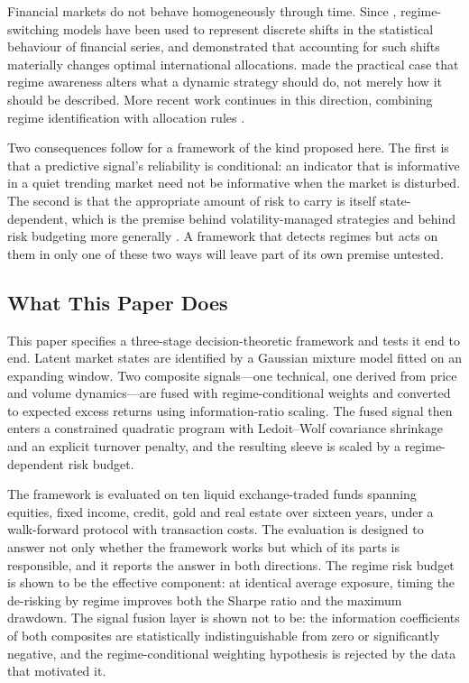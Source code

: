 Financial markets do not behave homogeneously through time. Since \citet{hamilton89},
regime-switching models have been used to represent discrete shifts in the statistical
behaviour of financial series, and \citet{angbekaert02} demonstrated that accounting for
such shifts materially changes optimal international allocations. \citet{kritzman12}
made the practical case that regime awareness alters what a dynamic strategy should do,
not merely how it should be described. More recent work continues in this direction,
combining regime identification with allocation rules \citep{li25, luo26}.

Two consequences follow for a framework of the kind proposed here. The first is that a
predictive signal's reliability is conditional: an indicator that is informative in a
quiet trending market need not be informative when the market is disturbed. The second
is that the appropriate amount of risk to carry is itself state-dependent, which is the
premise behind volatility-managed strategies \citep{moreira17, hood25} and behind risk
budgeting more generally \citep{asimit25}. A framework that detects regimes but acts on
them in only one of these two ways will leave part of its own premise untested.

\subsection{What This Paper Does}

This paper specifies a three-stage decision-theoretic framework and tests it end to
end. Latent market states are identified by a Gaussian mixture model fitted on an
expanding window. Two composite signals---one technical, one derived from price and
volume dynamics---are fused with regime-conditional weights and converted to expected
excess returns using information-ratio scaling. The fused signal then enters a
constrained quadratic program with Ledoit--Wolf covariance shrinkage
\citep{ledoit04} and an explicit turnover penalty, and the resulting sleeve is scaled by
a regime-dependent risk budget.

The framework is evaluated on ten liquid exchange-traded funds spanning equities, fixed
income, credit, gold and real estate over sixteen years, under a walk-forward protocol
with transaction costs. The evaluation is designed to answer not only whether the
framework works but which of its parts is responsible, and it reports the answer in
both directions. The regime risk budget is shown to be the effective component: at
identical average exposure, timing the de-risking by regime improves both the Sharpe
ratio and the maximum drawdown. The signal fusion layer is shown not to be: the
information coefficients of both composites are statistically indistinguishable from
zero or significantly negative, and the regime-conditional weighting hypothesis is
rejected by the data that motivated it.

